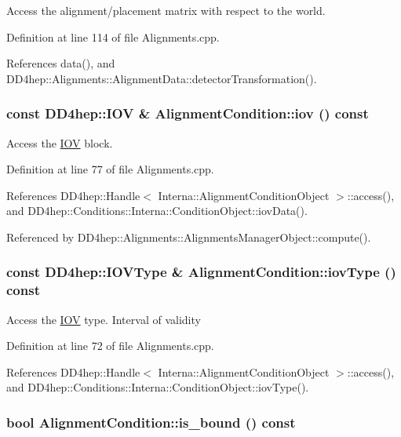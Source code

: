 Access the alignment/placement matrix with respect to the world. 

Definition at line 114 of file Alignments.cpp.

References data(), and DD4hep::Alignments::AlignmentData::detectorTransformation().\hypertarget{class_d_d4hep_1_1_alignments_1_1_alignment_condition_afdf431da7cfd5de1c2335376b8efe93f}{
\subsubsection[{iov}]{\setlength{\rightskip}{0pt plus 5cm}const {\bf DD4hep::IOV} \& AlignmentCondition::iov () const}}
\label{class_d_d4hep_1_1_alignments_1_1_alignment_condition_afdf431da7cfd5de1c2335376b8efe93f}


Access the \hyperlink{class_d_d4hep_1_1_i_o_v}{IOV} block. 

Definition at line 77 of file Alignments.cpp.

References DD4hep::Handle$<$ Interna::AlignmentConditionObject $>$::access(), and DD4hep::Conditions::Interna::ConditionObject::iovData().

Referenced by DD4hep::Alignments::AlignmentsManagerObject::compute().\hypertarget{class_d_d4hep_1_1_alignments_1_1_alignment_condition_a499330052ed8d30261c66bcd91984c17}{
\subsubsection[{iovType}]{\setlength{\rightskip}{0pt plus 5cm}const {\bf DD4hep::IOVType} \& AlignmentCondition::iovType () const}}
\label{class_d_d4hep_1_1_alignments_1_1_alignment_condition_a499330052ed8d30261c66bcd91984c17}


Access the \hyperlink{class_d_d4hep_1_1_i_o_v}{IOV} type. Interval of validity 

Definition at line 72 of file Alignments.cpp.

References DD4hep::Handle$<$ Interna::AlignmentConditionObject $>$::access(), and DD4hep::Conditions::Interna::ConditionObject::iovType().\hypertarget{class_d_d4hep_1_1_alignments_1_1_alignment_condition_af3a63d0ab5e82de20ccf9550b81d4473}{
\subsubsection[{is\_\-bound}]{\setlength{\rightskip}{0pt plus 5cm}bool AlignmentCondition::is\_\-bound () const}}
\label{class_d_d4hep_1_1_alignments_1_1_alignment_condition_af3a63d0ab5e82de20ccf9550b81d4473}


